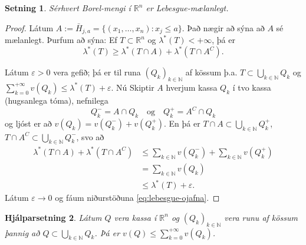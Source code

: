 \documentclass[a4paper,icelandic,11pt]{book}
\theoremstyle{plain}      \newtheorem{setn}{Setning}[chapter]
\newtheorem{lemma}[setn]{Hjálparsetning}
\theoremstyle{definition} \newtheorem{skilgr}[setn]{Skilgreining}
\theoremstyle{remark}     \newtheorem*{ath}{Athugasemd}
\newcommand{\R}{\mathbb R}
\newcommand{\N}{\mathbb N}
\begin{document}
\begin{setn}
  Sérhvert Borel-mengi í $\R^{n}$ er Lebesgue-mælanlegt.
\end{setn}
\begin{proof}
  Látum $A:=\bar H_{j,a} = \{(x_{1},\dots,x_{n}):x_{j}\le a\}$. Það
  nægir að sýna að $A$ sé mælanlegt. Þurfum að sýna: Ef
  $T\subset\R^{n}$ og $\lambda^{*}(T)<+\infty$, þá er
  \begin{equation}
    \label{eq:lebesgue-ojafna}
    \lambda^{*}(T)\ge \lambda^{*}(T\cap A) + \lambda^{*}(T\cap A^{C}).
  \end{equation}

  Látum $\varepsilon>0$ vera gefið; þá er til runa $(Q_{k})_{k\in\N}$
  af kössum þ.a. $T\subset\bigcup_{k\in\N}Q_{k}$ og
  $\sum_{k=0}^{+\infty}v(Q_{k})\le\lambda^{*}(T)+\varepsilon$. Nú
  Skiptir $A$ hverjum kassa $Q_{k}$ í tvo kassa (hugsanlega tóma),
  nefnilega
  \[
  Q^{-}_{k} = A\cap Q_{k}
  \quad\text{og}\quad
  Q^{+}_{k} = A^{C}\cap Q_{k}
  \]
  og ljóst er að $v(Q_{k})=v(Q_{k}^{-})+v(Q_{k}^{+})$. En þá er
  $T\cap{A}\subset\bigcup_{k\in\N}Q^{+}_{k}$,
  $T\cap{A}^{C}\subset\bigcup_{k\in\N}Q_{k}^{-}$, svo að
  \begin{align*}
    \lambda^{*}(T\cap A) + \lambda^{*}(T\cap A^{C})
    &\le \sum_{k\in\N} v(Q^{-}_{k}) + \sum_{k\in\N} v(Q^{+}_{k}) \\
    &= \sum_{k\in\N}v(Q_{k}) \\
    &\le \lambda^{*}(T)+\varepsilon.
  \end{align*}
  Látum $\varepsilon\to 0$ og fáum niðurstöðuna
  \eqref{eq:lebesgue-ojafna}.
\end{proof}
\begin{lemma}
  Látum $Q$ vera kassa í $\R^{n}$ og $(Q_{k})_{k\in\N}$ vera runu af
  kössum þannig að $Q\subset\bigcup_{k\in\N}Q_{k}$. Þá er
  $v(Q)\le\sum_{k=0}^{+\infty}v(Q_{k})$.
\end{lemma}
\end{document}
